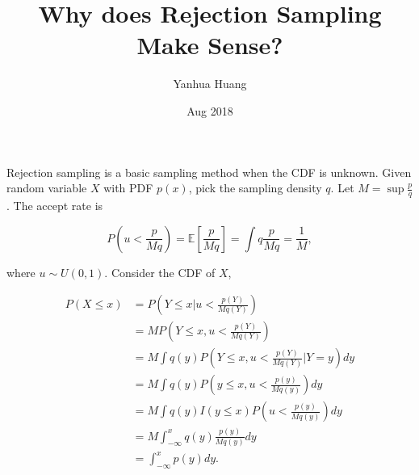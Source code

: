 \documentclass[a4paper,11pt]{article}
\begin{document}
\title{Why does Rejection Sampling Make Sense?}
\author{Yanhua Huang}
\date{Aug 2018}
\maketitle

Rejection sampling is a basic sampling method when the CDF is unknown. Given random variable $X$ with PDF $p(x)$, pick the sampling density $q$. Let $M=\sup \frac{p}{q}$. The accept rate is 

\begin{equation}
P(u < \frac{p}{Mq}) = \mathbb{E}[\frac{p}{Mq}] = \int q\frac{p}{Mq} = \frac{1}{M},
\end{equation}

where $u \sim U(0, 1)$. Consider the CDF of $X$,

\begin{align}
P(X \le x) &= P(Y \le x | u < \frac{p(Y)}{Mq(Y)}) \\
           &= MP(Y \le x, u < \frac{p(Y)}{Mq(Y)}) \\
           &= M\int q(y)P(Y \le x, u < \frac{p(Y)}{Mq(Y)} | Y = y)dy \\
           &= M\int q(y)P(y \le x, u < \frac{p(y)}{Mq(y)})dy \\
           &= M\int q(y)I(y \le x) P(u < \frac{p(y)}{Mq(y)})dy \\
           &= M\int_{-\infty}^{x} q(y)\frac{p(y)}{Mq(y)}dy \\
           &= \int_{-\infty}^{x} p(y)dy.
\end{align}
\end{document}
